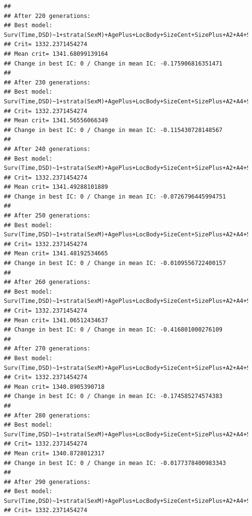 \documentclass{article}\usepackage[]{graphicx}\usepackage[]{color}
\makeatletter
\newenvironment{kframe}{%
 \def\at@end@of@kframe{}%
 \ifinner\ifhmode%
  \def\at@end@of@kframe{\end{minipage}}%
  \begin{minipage}{\columnwidth}%
 \fi\fi%
 \def\FrameCommand##1{\hskip\@totalleftmargin \hskip-\fboxsep
 \colorbox{shadecolor}{##1}\hskip-\fboxsep
     \hskip-\linewidth \hskip-\@totalleftmargin \hskip\columnwidth}%
 \MakeFramed {\advance\hsize-\width
   \@totalleftmargin\z@ \linewidth\hsize
   \@setminipage}}%
 {\par\unskip\endMakeFramed%
 \at@end@of@kframe}
\newenvironment{knitrout}{}{} %
\makeatother
\begin{document}
\begin{knitrout}
\begin{kframe}
{\ttfamily\noindent\color{warningcolor}{\#\# Warning in fitter(X, Y, strats, offset, init, control, weights = weights, : Loglik converged before variable\ \ 8 ; beta may be infinite.}}\begin{verbatim}
## 
## After 220 generations:
## Best model: Surv(Time,DSD)~1+strata(SexM)+AgePlus+LocBody+SizeCent+SizePlus+A2+A4+SizeCent:LocBody+A2:SizeCent+strata(SexM):AgePlus+strata(SexM):SizePlus
## Crit= 1332.2371454274
## Mean crit= 1341.68099139164
## Change in best IC: 0 / Change in mean IC: -0.175906816351471
## 
## After 230 generations:
## Best model: Surv(Time,DSD)~1+strata(SexM)+AgePlus+LocBody+SizeCent+SizePlus+A2+A4+SizeCent:LocBody+A2:SizeCent+strata(SexM):AgePlus+strata(SexM):SizePlus
## Crit= 1332.2371454274
## Mean crit= 1341.56556066349
## Change in best IC: 0 / Change in mean IC: -0.115430728148567
## 
## After 240 generations:
## Best model: Surv(Time,DSD)~1+strata(SexM)+AgePlus+LocBody+SizeCent+SizePlus+A2+A4+SizeCent:LocBody+A2:SizeCent+strata(SexM):AgePlus+strata(SexM):SizePlus
## Crit= 1332.2371454274
## Mean crit= 1341.49288101889
## Change in best IC: 0 / Change in mean IC: -0.0726796445994751
## 
## After 250 generations:
## Best model: Surv(Time,DSD)~1+strata(SexM)+AgePlus+LocBody+SizeCent+SizePlus+A2+A4+SizeCent:LocBody+A2:SizeCent+strata(SexM):AgePlus+strata(SexM):SizePlus
## Crit= 1332.2371454274
## Mean crit= 1341.48192534665
## Change in best IC: 0 / Change in mean IC: -0.0109556722400157
## 
## After 260 generations:
## Best model: Surv(Time,DSD)~1+strata(SexM)+AgePlus+LocBody+SizeCent+SizePlus+A2+A4+SizeCent:LocBody+A2:SizeCent+strata(SexM):AgePlus+strata(SexM):SizePlus
## Crit= 1332.2371454274
## Mean crit= 1341.06512434637
## Change in best IC: 0 / Change in mean IC: -0.416801000276109
## 
## After 270 generations:
## Best model: Surv(Time,DSD)~1+strata(SexM)+AgePlus+LocBody+SizeCent+SizePlus+A2+A4+SizeCent:LocBody+A2:SizeCent+strata(SexM):AgePlus+strata(SexM):SizePlus
## Crit= 1332.2371454274
## Mean crit= 1340.8905390718
## Change in best IC: 0 / Change in mean IC: -0.174585274574383
## 
## After 280 generations:
## Best model: Surv(Time,DSD)~1+strata(SexM)+AgePlus+LocBody+SizeCent+SizePlus+A2+A4+SizeCent:LocBody+A2:SizeCent+strata(SexM):AgePlus+strata(SexM):SizePlus
## Crit= 1332.2371454274
## Mean crit= 1340.8728012317
## Change in best IC: 0 / Change in mean IC: -0.0177378400983343
## 
## After 290 generations:
## Best model: Surv(Time,DSD)~1+strata(SexM)+AgePlus+LocBody+SizeCent+SizePlus+A2+A4+SizeCent:LocBody+A2:SizeCent+strata(SexM):AgePlus+strata(SexM):SizePlus
## Crit= 1332.2371454274

\end{verbatim}
\end{kframe}
\end{knitrout}
\end{document}
